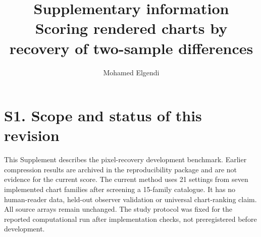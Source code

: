 \documentclass[10pt]{article}
\title{Supplementary information\\Scoring rendered charts by recovery of two-sample differences}
\author{Mohamed Elgendi}\date{}
\begin{document}
\maketitle
\section*{S1. Scope and status of this revision}
This Supplement describes the pixel-recovery development benchmark. Earlier compression results are archived in the reproducibility package and are not evidence for the current score. The current method uses 21 settings from seven implemented chart families after screening a 15-family catalogue. It has no human-reader data, held-out observer validation or universal chart-ranking claim. All source arrays remain unchanged. The study protocol was fixed for the reported computational run after implementation checks, not preregistered before development.
\end{document}
